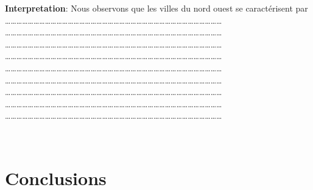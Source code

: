 \documentclass[
]{article}
\begin{document}
\textbf{Interpretation}: Nous observons que les villes du nord ouest se
caractérisent par\\
\ldots\ldots\ldots\ldots\ldots\ldots\ldots\ldots\ldots\ldots\ldots\ldots\ldots\ldots\ldots\ldots\ldots\ldots\ldots\ldots\ldots\ldots\ldots\ldots\ldots\ldots\ldots\ldots\ldots\ldots\ldots\ldots\ldots\ldots\ldots\ldots\ldots\ldots{}
\ldots\ldots\ldots\ldots\ldots\ldots\ldots\ldots\ldots\ldots\ldots\ldots\ldots\ldots\ldots\ldots\ldots\ldots\ldots\ldots\ldots\ldots\ldots\ldots\ldots\ldots\ldots\ldots\ldots\ldots\ldots\ldots\ldots\ldots\ldots\ldots\ldots\ldots{}
\ldots\ldots\ldots\ldots\ldots\ldots\ldots\ldots\ldots\ldots\ldots\ldots\ldots\ldots\ldots\ldots\ldots\ldots\ldots\ldots\ldots\ldots\ldots\ldots\ldots\ldots\ldots\ldots\ldots\ldots\ldots\ldots\ldots\ldots\ldots\ldots\ldots\ldots{}
\ldots\ldots\ldots\ldots\ldots\ldots\ldots\ldots\ldots\ldots\ldots\ldots\ldots\ldots\ldots\ldots\ldots\ldots\ldots\ldots\ldots\ldots\ldots\ldots\ldots\ldots\ldots\ldots\ldots\ldots\ldots\ldots\ldots\ldots\ldots\ldots\ldots\ldots{}
\ldots\ldots\ldots\ldots\ldots\ldots\ldots\ldots\ldots\ldots\ldots\ldots\ldots\ldots\ldots\ldots\ldots\ldots\ldots\ldots\ldots\ldots\ldots\ldots\ldots\ldots\ldots\ldots\ldots\ldots\ldots\ldots\ldots\ldots\ldots\ldots\ldots\ldots{}
\ldots\ldots\ldots\ldots\ldots\ldots\ldots\ldots\ldots\ldots\ldots\ldots\ldots\ldots\ldots\ldots\ldots\ldots\ldots\ldots\ldots\ldots\ldots\ldots\ldots\ldots\ldots\ldots\ldots\ldots\ldots\ldots\ldots\ldots\ldots\ldots\ldots\ldots{}
\ldots\ldots\ldots\ldots\ldots\ldots\ldots\ldots\ldots\ldots\ldots\ldots\ldots\ldots\ldots\ldots\ldots\ldots\ldots\ldots\ldots\ldots\ldots\ldots\ldots\ldots\ldots\ldots\ldots\ldots\ldots\ldots\ldots\ldots\ldots\ldots\ldots\ldots{}
\ldots\ldots\ldots\ldots\ldots\ldots\ldots\ldots\ldots\ldots\ldots\ldots\ldots\ldots\ldots\ldots\ldots\ldots\ldots\ldots\ldots\ldots\ldots\ldots\ldots\ldots\ldots\ldots\ldots\ldots\ldots\ldots\ldots\ldots\ldots\ldots\ldots\ldots{}
\ldots\ldots\ldots\ldots\ldots\ldots\ldots\ldots\ldots\ldots\ldots\ldots\ldots\ldots\ldots\ldots\ldots\ldots\ldots\ldots\ldots\ldots\ldots\ldots\ldots\ldots\ldots\ldots\ldots\ldots\ldots\ldots\ldots\ldots\ldots\ldots\ldots\ldots{}

~

\hypertarget{conclusions}{%
\section{\texorpdfstring{\textbf{Conclusions
}}{Conclusions }}\label{conclusions}}
\end{document}
